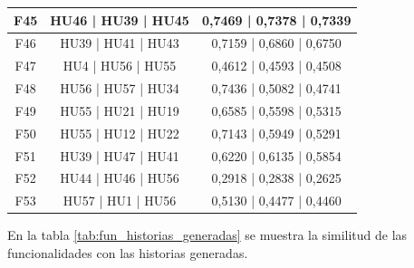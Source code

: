\documentclass{prgrado}
\begin{document}
\begin{longtable}{|c|c|c|}
F45 & HU46 | HU39 | HU45 & 0,7469 | 0,7378 | 0,7339 \\ \hline
F46 & HU39 | HU41 | HU43 & 0,7159 | 0,6860 | 0,6750 \\ \hline
F47 & HU4 | HU56 | HU55 & 0,4612 | 0,4593 | 0,4508 \\ \hline
F48 & HU56 | HU57 | HU34 & 0,7436 | 0,5082 | 0,4741 \\ \hline
F49 & HU55 | HU21 | HU19 & 0,6585 | 0,5598 | 0,5315 \\ \hline
F50 & HU55 | HU12 | HU22 & 0,7143 | 0,5949 | 0,5291 \\ \hline
F51 & HU39 | HU47 | HU41 & 0,6220 | 0,6135 | 0,5854 \\ \hline
F52 & HU44 | HU46 | HU56 & 0,2918 | 0,2838 | 0,2625 \\ \hline
F53 & HU57 | HU1 | HU56 & 0,5130 | 0,4477 | 0,4460 \\ \hline

\end{longtable}

En la tabla \ref{tab:fun_historias_generadas} se muestra la similitud de las funcionalidades con las historias generadas.
\end{document}
